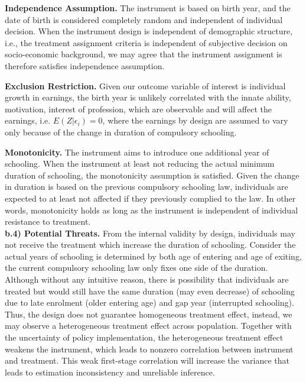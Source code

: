 \documentclass[a4paper,12pt,oneside,English]{article}
\begin{document}
\textbf{Independence Assumption.} The instrument is based on birth year, and the date of birth is considered completely random and independent of individual decision. When the instrument design is independent of demographic structure, i.e., the treatment assignment criteria is independent of subjective decision on socio-economic background, we may agree that the instrument assignment is therefore satisfies independence assumption.

\textbf{Exclusion Restriction.} Given our outcome variable of interest is individual growth in earnings, the birth year is unlikely correlated with the innate ability, motivation, interest of profession, which are observable and will affect the earnings, i.e. $E(Z|\epsilon_i)=0$, where the earnings by design are assumed to vary only because of the change in duration of compulsory schooling.

\textbf{Monotonicity.} The instrument aims to introduce one additional year of schooling. When the instrument at least not reducing the actual minimum duration of schooling, the monotonicity assumption is satisfied. Given the change in duration is based on the previous compulsory schooling law, individuals are expected to at least not affected if they previously complied to the law. In other words, monotonicity holds as long as the instrument is independent of individual resistance to treatment.\\

\textbf{b.4) Potential Threats.} From the internal validity by design, individuals may not receive the treatment which increase the duration of schooling. Consider the actual years of schooling is determined by both age of entering and age of exiting, the current compulsory schooling law only fixes one side of the duration. Although without any intuitive reason, there is possibility that individuals are treated but would still have the same duration (may even decrease) of schooling due to late enrolment (older entering age) and gap year (interrupted schooling). Thus, the design does not guarantee homogeneous treatment effect, instead, we may observe a heterogeneous treatment effect across population. Together with the uncertainty of policy implementation, the heterogeneous treatment effect weakens the instrument, which leads to nonzero correlation between instrument and treatment. This weak first-stage correlation will increase the variance that leads to estimation inconsistency and unreliable inference.
\end{document}

